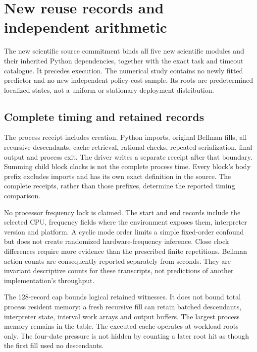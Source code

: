 \section{New reuse records and independent arithmetic}\label{app:audit72}
The new scientific source commitment binds all five new scientific modules and their inherited Python dependencies, together with the exact task and timeout catalogue. It precedes execution. The numerical study contains no newly fitted predictor and no new independent policy-cost sample. Its roots are predetermined localized states, not a uniform or stationary deployment distribution.




\subsection{Complete timing and retained records}
The process receipt includes creation, Python imports, original Bellman fills, all recursive descendants, cache retrieval, rational checks, repeated serialization, final output and process exit. The driver writes a separate receipt after that boundary. Summing child block clocks is not the complete process time. Every block's body prefix excludes imports and has its own exact definition in the source. The complete receipts, rather than those prefixes, determine the reported timing comparison.

No processor frequency lock is claimed. The start and end records include the selected CPU, frequency fields where the environment exposes them, interpreter version and platform. A cyclic mode order limits a simple fixed-order confound but does not create randomized hardware-frequency inference. Close clock differences require more evidence than the prescribed finite repetitions. Bellman action counts are consequently reported separately from seconds. They are invariant descriptive counts for these transcripts, not predictions of another implementation's throughput.

The 128-record cap bounds logical retained witnesses. It does not bound total process resident memory: a fresh recursive fill can retain batched descendants, interpreter state, interval work arrays and output buffers. The largest process memory remains in the table. The executed cache operates at workload roots only. The four-date pressure is not hidden by counting a later root hit as though the first fill used no descendants.

